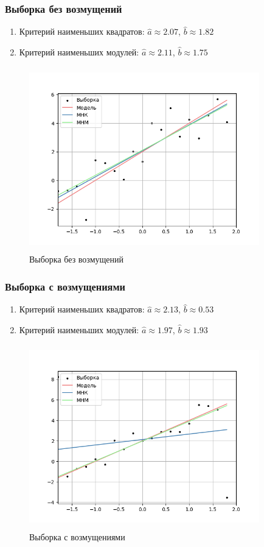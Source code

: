 \subsubsection{Выборка без возмущений}
\begin{enumerate}
	\item{Критерий наименьших квадратов:}
	$\hat{a}\approx 2.07$, $\hat{b}\approx 1.82$
	\item{Критерий наименьших модулей:}
	$\hat{a}\approx 2.11$, $\hat{b}\approx 1.75$
\end{enumerate}
\begin{figure}[H]
	\centering
	\includegraphics[width = 10cm, height = 8cm]{resources/6_1.png}
	\caption{Выборка без возмущений}
	\label{w/o_pert}
\end{figure}

\subsubsection{Выборка с возмущениями}
\begin{enumerate}
	\item{Критерий наименьших квадратов:}
	$\hat{a}\approx 2.13$, $\hat{b}\approx 0.53$
	\item{Критерий наименьших модулей:}
	$\hat{a}\approx 1.97$, $\hat{b}\approx 1.93$
\end{enumerate}
\begin{figure}[H]
	\centering
	\includegraphics[width = 10cm, height = 8cm]{resources/6_2.png}
	\caption{Выборка с возмущениями}
	\label{w_pert}
\end{figure}

